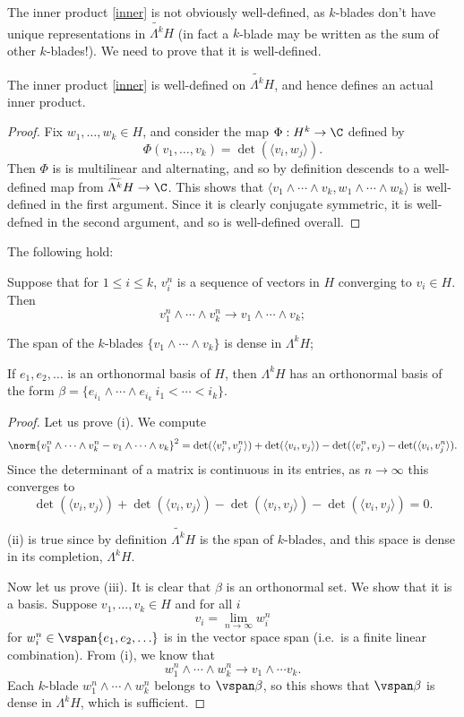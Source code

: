 \documentclass[12pt]{amsart}
\begin{document}
The inner product \eqref{inner} is not obviously well-defined, as $k$-blades don't have unique representations in $\widetilde{\Lambda^k}H$ (in fact a $k$-blade may be written as the sum of other $k$-blades!). We need to prove that it is well-defined.
\begin{lem}The inner product \eqref{inner} is well-defined on $\widetilde{\Lambda^k}H$, and hence defines an actual inner product.\end{lem}
\begin{proof}
 Fix $w_1,\ldots, w_k \in H$, and consider the map $\Phi:H^k \to \C$ defined by
\[\Phi(v_1,\ldots,v_k) = \det(\langle v_i,w_j\rangle).\] Then $\Phi$ is is multilinear and alternating, and so by definition descends to a well-defined map from $\widetilde{\Lambda^k}H \to \C$. This shows that $\langle v_1\wedge \cdots \wedge v_k,w_1 \wedge \cdots \wedge w_k\rangle$ is well-defined in the first argument. Since it is clearly conjugate symmetric, it is well-defned in the second argument, and so is well-defined overall.
\end{proof}


\begin{lem}\label{props}The following hold:
\begin{romanumerate}
\item Suppose that for $1 \leq i \leq k$, $v_i^n$ is a sequence of vectors in $H$ converging to $v_i \in H$. Then
\[v_1^n \wedge \cdots \wedge v_k^n \to v_1 \wedge \cdots \wedge v_k;\]
\item The span of the $k$-blades $\{v_1\wedge \cdots \wedge v_k\}$ is dense in $\Lambda^k H$;
\item If $e_1,e_2,\ldots$ is an orthonormal basis of $H$, then $\Lambda^k H$ has an orthonormal basis of the form $\beta = \{e_{i_1}\wedge \cdots \wedge e_{i_k}\: i_1 < \cdots < i_k\}$.
\end{romanumerate} \end{lem}
\begin{proof}
Let us prove (i). We compute
\[\norm{v_1^n \wedge \cdots \wedge v_k^n-v_1 \wedge \cdots \wedge v_k}^2 = \det(\langle v_i^n,v_j^n\rangle) + \det(\langle v_i,v_j\rangle) - \det(\langle v_i^n,v_j)-\det(\langle v_i,v_j^n\rangle).\]
Since the determinant of a matrix is continuous in its entries, as $n \to \infty$ this converges to
\[\det(\langle v_i,v_j\rangle) + \det(\langle v_i,v_j\rangle) - \det(\langle v_i,v_j\rangle) - \det(\langle v_i,v_j\rangle) = 0.\]

(ii) is true since by definition $\widetilde{\Lambda^k}H$ is the span of $k$-blades, and this space is dense in its completion, $\Lambda^k H$.

Now let us prove (iii). It is clear that $\beta$ is an orthonormal set. We show that it is a basis. Suppose $v_1,\ldots,v_k \in H$ and for all $i$
\[v_i = \lim_{n \to \infty} w_i^n\] for $w_i^n \in \vspan\{e_1,e_2,\ldots\}$ is in the vector space span (i.e.\ is a finite linear combination). From (i), we know that
\[w_1^n\wedge\cdots\wedge w_k^n \to v_1\wedge\cdots v_k.\] Each $k$-blade $w_1^n\wedge\cdots\wedge w_k^n$ belongs to $\vspan \beta$, so this shows that $\vspan \beta$ is dense in $\Lambda^k H$, which is sufficient.
\end{proof}
\end{document}
